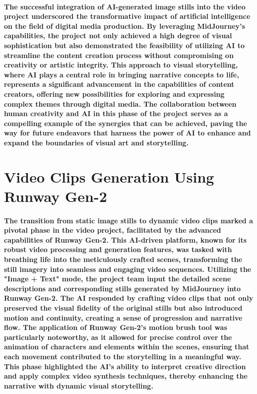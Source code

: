 \documentclass[11pt,a4paper,oneside]{report}
\begin{document}
\paragraph{The successful integration of AI-generated image stills into the video project underscored the transformative impact of artificial intelligence on the field of digital media production. By leveraging MidJourney's capabilities, the project not only achieved a high degree of visual sophistication but also demonstrated the feasibility of utilizing AI to streamline the content creation process without compromising on creativity or artistic integrity. This approach to visual storytelling, where AI plays a central role in bringing narrative concepts to life, represents a significant advancement in the capabilities of content creators, offering new possibilities for exploring and expressing complex themes through digital media. The collaboration between human creativity and AI in this phase of the project serves as a compelling example of the synergies that can be achieved, paving the way for future endeavors that harness the power of AI to enhance and expand the boundaries of visual art and storytelling.}

\section{Video Clips Generation Using Runway Gen-2}

\paragraph{The transition from static image stills to dynamic video clips marked a pivotal phase in the video project, facilitated by the advanced capabilities of Runway Gen-2. This AI-driven platform, known for its robust video processing and generation features, was tasked with breathing life into the meticulously crafted scenes, transforming the still imagery into seamless and engaging video sequences. Utilizing the "Image + Text" mode, the project team input the detailed scene descriptions and corresponding stills generated by MidJourney into Runway Gen-2. The AI responded by crafting video clips that not only preserved the visual fidelity of the original stills but also introduced motion and continuity, creating a sense of progression and narrative flow. The application of Runway Gen-2's motion brush tool was particularly noteworthy, as it allowed for precise control over the animation of characters and elements within the scenes, ensuring that each movement contributed to the storytelling in a meaningful way. This phase highlighted the AI's ability to interpret creative direction and apply complex video synthesis techniques, thereby enhancing the narrative with dynamic visual storytelling.}
\end{document}
